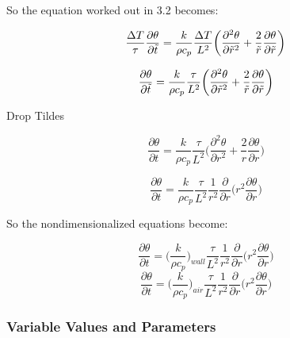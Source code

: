 \documentclass{article}
\begin{document}
So the equation worked out in 3.2 becomes:

\[\frac{\Delta T}{\tau} \frac{\partial \theta}{\partial \Tilde{t}} = \frac{k}{\rho c_p} \frac{\Delta T}{L^2} \bigg(\frac{\partial^2 \theta}{\partial \Tilde{r}^2} + \frac{2}{\Tilde{r}} \frac{\partial \theta}{\partial \Tilde{r}}\bigg)\]

\[\frac{\partial \theta}{\partial \Tilde{t}} = \frac{k}{\rho c_p} \frac{\tau}{L^2} \bigg(\frac{\partial^2 \theta}{\partial \Tilde{r}^2} + \frac{2}{\Tilde{r}} \frac{\partial \theta}{\partial \Tilde{r}}\bigg)\]

Drop Tildes

\[\frac{\partial \theta}{\partial t} = \frac{k}{\rho c_p} \frac{\tau}{L^2} \bigg(\frac{\partial^2 \theta}{\partial r^2} + \frac{2}{r} \frac{\partial \theta}{\partial r}\bigg)\]

\[\frac{\partial \theta}{\partial t} = \frac{k}{\rho c_p} \frac{\tau}{L^2} \frac{1}{r^2} \frac{\partial}{\partial r} \bigg(r^2 \frac{\partial \theta}{\partial r}\bigg)\]

So the nondimensionalized equations become:

\[\frac{\partial \theta}{\partial t} = \bigg(\frac{k}{\rho c_p}\bigg)_{wall} \frac{\tau}{L^2} \frac{1}{r^2} \frac{\partial}{\partial r} \bigg(r^2 \frac{\partial \theta}{\partial r}\bigg)\]
\[\frac{\partial \theta}{\partial t} = \bigg(\frac{k}{\rho c_p}\bigg)_{air} \frac{\tau}{L^2} \frac{1}{r^2} \frac{\partial}{\partial r} \bigg(r^2 \frac{\partial \theta}{\partial r}\bigg)\]

\subsubsection{Variable Values and Parameters}
\end{document}

